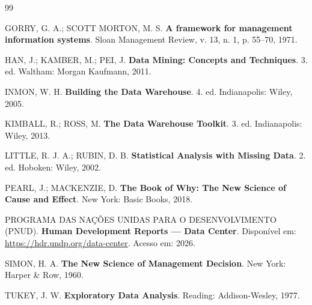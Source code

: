 \documentclass[11pt,a4paper]{article}
\begin{document}
\begin{thebibliography}{99}

GORRY, G. A.; SCOTT MORTON, M. S. \textbf{A framework for management information systems}. Sloan Management Review, v. 13, n. 1, p. 55--70, 1971.

HAN, J.; KAMBER, M.; PEI, J. \textbf{Data Mining: Concepts and Techniques}. 3. ed. Waltham: Morgan Kaufmann, 2011.

INMON, W. H. \textbf{Building the Data Warehouse}. 4. ed. Indianapolis: Wiley, 2005.

KIMBALL, R.; ROSS, M. \textbf{The Data Warehouse Toolkit}. 3. ed. Indianapolis: Wiley, 2013.

LITTLE, R. J. A.; RUBIN, D. B. \textbf{Statistical Analysis with Missing Data}. 2. ed. Hoboken: Wiley, 2002.

PEARL, J.; MACKENZIE, D. \textbf{The Book of Why: The New Science of Cause and Effect}. New York: Basic Books, 2018.

PROGRAMA DAS NAÇÕES UNIDAS PARA O DESENVOLVIMENTO (PNUD). \textbf{Human Development Reports --- Data Center}. Disponível em: \url{https://hdr.undp.org/data-center}. Acesso em: 2026.

SIMON, H. A. \textbf{The New Science of Management Decision}. New York: Harper \& Row, 1960.

TUKEY, J. W. \textbf{Exploratory Data Analysis}. Reading: Addison-Wesley, 1977.

\end{thebibliography}
\end{document}
